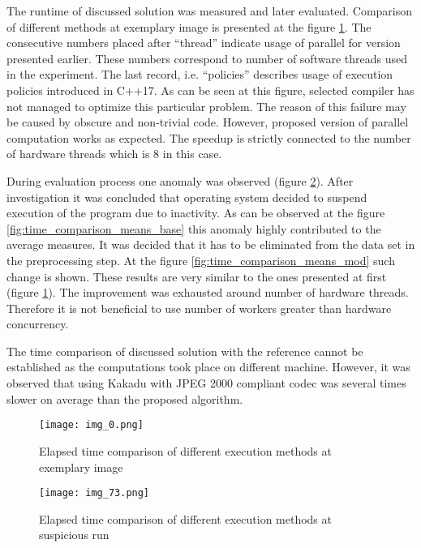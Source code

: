 The runtime of discussed solution was measured and later evaluated. Comparison of different
methods at exemplary image is presented at the figure \ref{fig:time_comparison_example}. The consecutive
numbers placed after ``thread'' indicate usage of parallel for version presented earlier.
These numbers correspond to number of software threads used in the experiment. The last record, i.e.
``policies'' describes usage of execution policies introduced in C++17. As can be seen at this
figure, selected compiler has not managed to optimize this particular problem. The reason of
this failure may be caused by obscure and non-trivial code. However, proposed version of parallel
computation works as expected. The speedup is strictly connected to the number of hardware threads
which is 8 in this case.

During evaluation process one anomaly was observed (figure \ref{fig:time_comparison_sus}). After investigation
it was concluded that operating system decided to suspend execution of the program due to inactivity.
As can be observed at the figure \ref{fig:time_comparison_means_base} this anomaly highly contributed
to the average measures. It was decided that it has to be eliminated from the data set in the
preprocessing step. At the figure \ref{fig:time_comparison_means_mod} such change is shown.
These results are very similar to the ones presented at first (figure \ref{fig:time_comparison_example}).
The improvement was exhausted around number of hardware threads. Therefore it is not beneficial to
use number of workers greater than hardware concurrency.

The time comparison of discussed solution with the reference cannot be established as the computations
took place on different machine. However, it was observed that using Kakadu with JPEG 2000 compliant codec
was several times slower on average than the proposed algorithm.

\begin{figure}[!htb]
    \centering
    \texttt{[image: img\_0.png]}
    \caption{Elapsed time comparison of different execution methods at exemplary image}
    \label{fig:time_comparison_example}
\end{figure}

\begin{figure}[!htb]
    \centering
    \texttt{[image: img\_73.png]}
    \caption{Elapsed time comparison of different execution methods at suspicious run}
    \label{fig:time_comparison_sus}
\end{figure}

